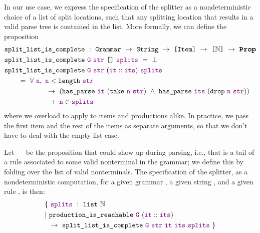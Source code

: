     In our use case, we express the specification of the splitter as a nondeterministic choice of a list of split locations, such that any splitting location that results in a valid parse tree is contained in the list.  More formally, we can define the proposition
\begin{align*}
  &\fname{split\_list\_is\_complete} ~:~\indname{Grammar}~\to~\indname{String}~\to~\typelist{\indname{Item}}~\to~\typelist{\mathbb{N}}~\to~\Prop \\
  &\fname{split\_list\_is\_complete}~\farg{G}~\farg{str}~\nil~\farg{splits}~=~\False \\
  &\fname{split\_list\_is\_complete} ~\farg{G}~\farg{str}~(\cons{\farg{it}}{\farg{its}}) ~\farg{splits} \\
  &\qquad=~\forall~\farg{n},~\farg{n}<\fname{length}~\farg{str} \\
  &\qquad\qquad\qquad\to~(\fname{has\_parse}~\farg{it}~(\fname{take}~\farg{n}~\farg{str})~\wedge~\fname{has\_parse}~\farg{its}~(\fname{drop}~\farg{n}~\farg{str})) \\
  &\qquad\qquad\qquad\to~\farg{n}\in\farg{splits}
\end{align*}
    where we overload  to apply to items and productions alike.  In practice, we pass the first item and the rest of the items as separate arguments, so that we don't have to deal with the empty list case.
    
    Let ~~ be the proposition that  could show up during parsing, i.e., that  is a tail of a rule associated to some valid nonterminal in the grammar; we define this by folding over the list of valid nonterminals.  The specification of the splitter, as a nondeterministic computation, for a given grammar , a given string , and a given rule , is then:
\begin{align*}
& \{~\textcolor{violet}{\texttt{splits}}~:~\texttt{list}~{\mathbb{N}} \\
& |~\texttt{production\_is\_reachable}~\textcolor{violet}{\texttt{G}}~(\textcolor{violet}{\texttt{it}}::\textcolor{violet}{\texttt{its}})\\
&\phantom{|~}\to~\texttt{split\_list\_is\_complete}~\textcolor{violet}{\texttt{G}}~\textcolor{violet}{\texttt{str}}~\textcolor{violet}{\texttt{it}}~\textcolor{violet}{\texttt{its}}~\textcolor{violet}{\texttt{splits}}~\}
\end{align*}
    

